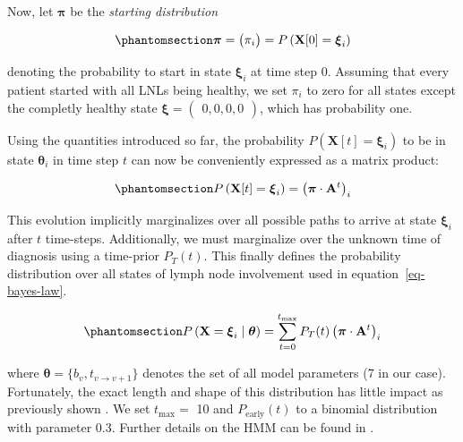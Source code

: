 \documentclass[11pt,twocolumn,twoside]{article}
\begin{document}
Now, let \(\boldsymbol{\pi}\) be the \emph{starting distribution}

\begin{equation}\phantomsection\label{eq-starting-distribution}{
\boldsymbol{\pi} = \begin{pmatrix} \pi_i \end{pmatrix} = P \left( \mathbf{X}[0] = \boldsymbol{\xi}_i \right)
}\end{equation}

denoting the probability to start in state \(\boldsymbol{\xi}_i\) at
time step 0. Assuming that every patient started with all LNLs being
healthy, we set \(\pi_i\) to zero for all states except the completly
healthy state
\(\boldsymbol{\xi} = \begin{pmatrix} 0, 0, 0, 0 \end{pmatrix}\), which
has probability one.

Using the quantities introduced so far, the probability
\(P \left( \mathbf{X}[t]=\boldsymbol{\xi}_i \right)\) to be in state
\(\boldsymbol{\theta}_i\) in time step \(t\) can now be conveniently
expressed as a matrix product:

\begin{equation}\phantomsection\label{eq-evolution}{
P \left( \mathbf{X}[t]=\boldsymbol{\xi}_i \right) = \left( \boldsymbol{\pi} \cdot \mathbf{A}^t \right)_i
}\end{equation}

This evolution implicitly marginalizes over all possible paths to arrive
at state \(\boldsymbol{\xi}_i\) after \(t\) time-steps. Additionally, we
must marginalize over the unknown time of diagnosis using a time-prior
\(P_T(t)\). This finally defines the probability distribution over all
states of lymph node involvement used in equation~\ref{eq-bayes-law}.

\begin{equation}\phantomsection\label{eq-marginalized-evolution}{
P \left( \mathbf{X}=\boldsymbol{\xi}_i \mid \boldsymbol{\theta} \right) = \sum_{t=0}^{t_\text{max}} P_T(t) \left( \boldsymbol{\pi} \cdot \mathbf{A}^t \right)_i
}\end{equation}

where \(\boldsymbol{\theta}=\{ b_v, t_{v \rightarrow v+1} \}\) denotes
the set of all model parameters (7 in our case). Fortunately, the exact
length and shape of this distribution has little impact as previously
shown \autocite{ludwig_hidden_2021}. We set \(t_\text{max}=\) 10 and
\(P_\text{early}(t)\) to a binomial distribution with parameter 0.3.
Further details on the HMM can be found in
\textcite{ludwig_hidden_2021}.
\end{document}
